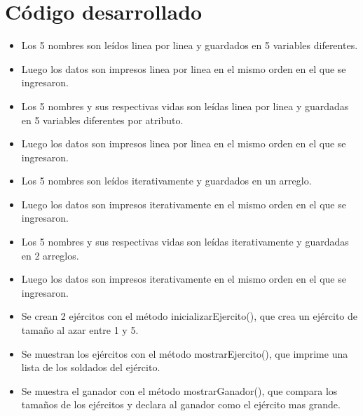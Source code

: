 \documentclass{article}
\begin{document}
\pagebreak
\section{Código desarrollado}


\begin{itemize}
	\item Los 5 nombres son leídos linea por linea y guardados en 5 variables diferentes.
	\item Luego los datos son impresos linea por linea en el mismo orden en el que se ingresaron.
\end{itemize}
\pagebreak

\begin{itemize}
	\item Los 5 nombres y sus respectivas vidas son leídas linea por linea y guardadas en 5 variables diferentes por atributo.
	\item Luego los datos son impresos linea por linea en el mismo orden en el que se ingresaron.
\end{itemize}
\pagebreak

\begin{itemize}
	\item Los 5 nombres son leídos iterativamente y guardados en un arreglo.
	\item Luego los datos son impresos iterativamente en el mismo orden en el que se ingresaron.
\end{itemize}

\begin{itemize}
	\item Los 5 nombres y sus respectivas vidas son leídas iterativamente y guardadas en 2 arreglos.
	\item Luego los datos son impresos iterativamente en el mismo orden en el que se ingresaron.
\end{itemize}
\pagebreak

\begin{itemize}
	\item Se crean 2 ejércitos con el método inicializarEjercito(), que crea un ejército de tamaño al azar entre 1 y 5.
	\item Se muestran los ejércitos con el método mostrarEjercito(), que imprime una lista de los soldados del ejército.
	\item Se muestra el ganador con el método mostrarGanador(), que compara los tamaños de los ejércitos y declara al ganador como el ejército mas grande.
\end{itemize}
\pagebreak
\end{document}
